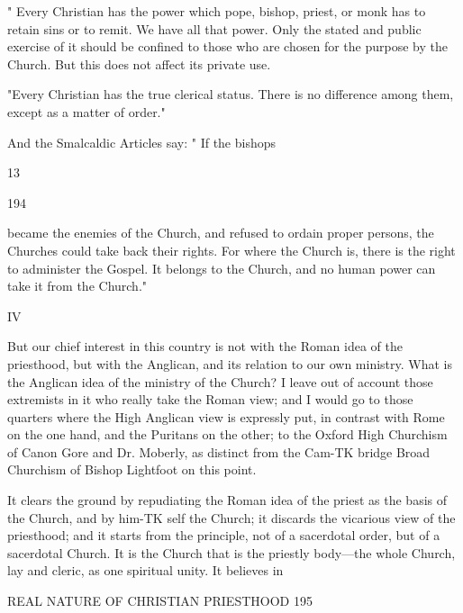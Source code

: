 \documentclass[12pt,a5paper,twoside]{book}
\begin{document}
{" Every Christian has the power which pope, 
bishop, priest, or monk has to retain sins or to remit. 
We have all that power. Only the stated and public 
exercise of it should be confined to those who are 
chosen for the purpose by the Church. But this does 
not affect its private use. 

"Every Christian has the true clerical status. 
There is no difference among them, except as a matter 
of order." 

And the Smalcaldic Articles say: " If the bishops 

13 



194 

became the enemies of the Church, and refused to 
ordain proper persons, the Churches could take back 
their rights. For where the Church is, there is the 
right to administer the Gospel. It belongs to the 
Church, and no human power can take it from the 
Church." 

IV 

But our chief interest in this country is not with the 
Roman idea of the priesthood, but with the Anglican, 
and its relation to our own ministry. What is the 
Anglican idea of the ministry of the Church? I leave 
out of account those extremists in it who really take 
the Roman view; and I would go to those quarters 
where the High Anglican view is expressly put, in 
contrast with Rome on the one hand, and the Puritans 
on the other; to the Oxford High Churchism of Canon 
Gore and Dr. Moberly, as distinct from the Cam-TK
bridge Broad Churchism of Bishop Lightfoot on this 
point. 

It clears the ground by repudiating the Roman idea 
of the priest as the basis of the Church, and by him-TK
self the Church; it discards the vicarious view of the 
priesthood; and it starts from the principle, not of a 
sacerdotal order, but of a sacerdotal Church. It is the 
Church that is the priestly body---the whole Church, 
lay and cleric, as one spiritual unity. It believes in 



REAL NATURE OF CHRISTIAN PRIESTHOOD 195 

}
\end{document}
